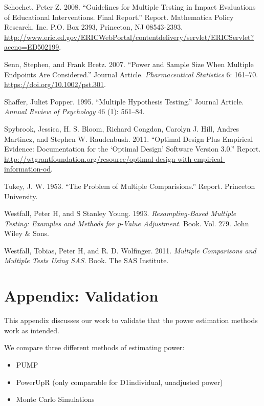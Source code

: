 \documentclass[
]{article}
\providecommand{\tightlist}{%
  \setlength{\itemsep}{0pt}\setlength{\parskip}{0pt}}
\newlength{\cslhangindent}
\newlength{\cslentryspacingunit} %
\newenvironment{CSLReferences}[2] %
 {%
  \setlength{\parindent}{0pt}
  \ifodd #1
  \let\oldpar\par
  \def\par{\hangindent=\cslhangindent\oldpar}
  \fi
  \setlength{\parskip}{#2\cslentryspacingunit}
 }%
 {}
\begin{document}
\begin{CSLReferences}{1}{0}
\leavevmode{}%
Schochet, Peter Z. 2008. {``Guidelines for Multiple Testing in Impact
Evaluations of Educational Interventions. Final Report.''} Report.
Mathematica Policy Research, Inc. P.O. Box 2393, Princeton, NJ
08543-2393.
\url{http://www.eric.ed.gov/ERICWebPortal/contentdelivery/servlet/ERICServlet?accno=ED502199}.

\leavevmode{}%
Senn, Stephen, and Frank Bretz. 2007. {``Power and Sample Size When
Multiple Endpoints Are Considered.''} Journal Article.
\emph{Pharmaceutical Statistics} 6: 161--70.
\url{https://doi.org/10.1002/pst.301}.

\leavevmode{}%
Shaffer, Juliet Popper. 1995. {``Multiple Hypothesis Testing.''} Journal
Article. \emph{Annual Review of Psychology} 46 (1): 561--84.

\leavevmode{}%
Spybrook, Jessica, H. S. Bloom, Richard Congdon, Carolyn J. Hill, Andres
Martinez, and Stephen W. Raudenbush. 2011. {``Optimal Design Plus
Empirical Evidence: Documentation for the {`Optimal Design'} Software
Version 3.0.''} Report.
\url{http://wtgrantfoundation.org/resource/optimal-design-with-empirical-information-od}.

\leavevmode{}%
Tukey, J. W. 1953. {``The Problem of Multiple Comparisions.''} Report.
Princeton University.

\leavevmode{}%
Westfall, Peter H, and S Stanley Young. 1993. \emph{Resampling-Based
Multiple Testing: Examples and Methods for p-Value Adjustment}. Book.
Vol. 279. John Wiley \& Sons.

\leavevmode{}%
Westfall, Tobias, Peter H, and R. D. Wolfinger. 2011. \emph{Multiple
Comparisons and Multiple Tests Using SAS}. Book. The SAS Institute.

\end{CSLReferences}

\section{Appendix: Validation}

This appendix discusses our work to validate that the power estimation
methods work as intended.

We compare three different methods of estimating power:

\begin{itemize}
\tightlist
\item
  PUMP
\item
  PowerUpR (only comparable for D1individual, unadjusted power)
\item
  Monte Carlo Simulations
\end{itemize}
\end{document}
